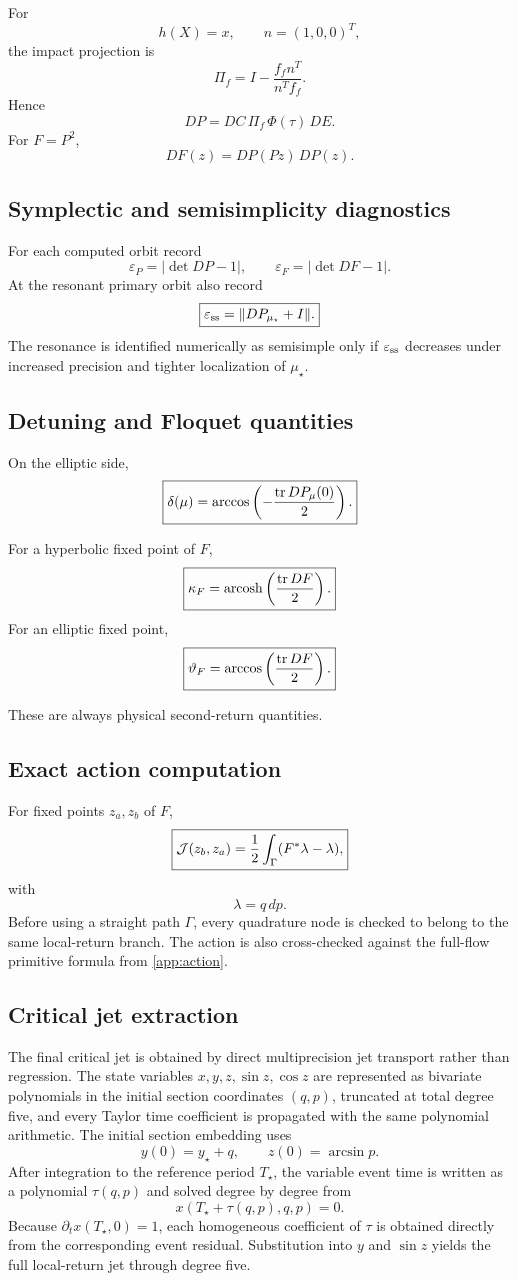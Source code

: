 For
\[
h(X)=x,\qquad n=(1,0,0)^T,
\]
the impact projection is
\[
\boxed{
\Pi_f=I-\frac{f_fn^T}{n^Tf_f}.
}
\]
Hence
\[
\boxed{
DP=DC\,\Pi_f\,\Phi(\tau)\,DE.
}
\]
For \(F=P^2\),
\[
\boxed{
DF(z)=DP(Pz)\,DP(z).
}
\]

\subsection{Symplectic and semisimplicity diagnostics}

For each computed orbit record
\[
\boxed{
\varepsilon_P=|\det DP-1|,
}
\qquad
\boxed{
\varepsilon_F=|\det DF-1|.
}
\]
At the resonant primary orbit also record
\[
\boxed{
\varepsilon_{\rm ss}=\|DP_{\mu_\star}+I\|.
}
\]
The resonance is identified numerically as semisimple only if \(\varepsilon_{\rm ss}\) decreases under increased precision and tighter localization of \(\mu_\star\).

\subsection{Detuning and Floquet quantities}

On the elliptic side,
\[
\boxed{
\delta(\mu)
=
\arccos\left(-\frac{\operatorname{tr} DP_\mu(0)}2\right).
}
\]

For a hyperbolic fixed point of \(F\),
\[
\boxed{
\kappa_F
=
\operatorname{arcosh}\left(\frac{\operatorname{tr} DF}{2}\right).
}
\]
For an elliptic fixed point,
\[
\boxed{
\vartheta_F
=
\arccos\left(\frac{\operatorname{tr} DF}{2}\right).
}
\]

These are always physical second-return quantities.

\subsection{Exact action computation}

For fixed points \(z_a,z_b\) of \(F\),
\[
\boxed{
\mathcal{J}(z_b,z_a)
=
\frac12
\int_\Gamma(F^*\lambda-\lambda),
}
\]
with
\[
\lambda=q\,dp.
\]
Before using a straight path \(\Gamma\), every quadrature node is checked to belong to the same local-return branch. The action is also cross-checked against the full-flow primitive formula from \cref{app:action}.

\subsection{Critical jet extraction}

The final critical jet is obtained by direct multiprecision jet transport rather than regression.  The state variables $x,y,z,\sin z,\cos z$ are represented as bivariate polynomials in the initial section coordinates $(q,p)$, truncated at total degree five, and every Taylor time coefficient is propagated with the same polynomial arithmetic.  The initial section embedding uses
\[
y(0)=y_\star+q,\qquad z(0)=\arcsin p.
\]
After integration to the reference period $T_\star$, the variable event time is written as a polynomial $\tau(q,p)$ and solved degree by degree from
\[
x(T_\star+\tau(q,p),q,p)=0.
\]
Because $\partial_t x(T_\star,0)=1$, each homogeneous coefficient of $\tau$ is obtained directly from the corresponding event residual.  Substitution into $y$ and $\sin z$ yields the full local-return jet through degree five.

